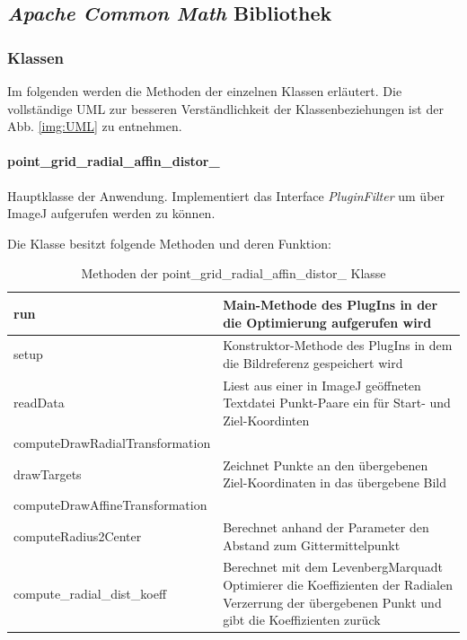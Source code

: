 \subsection{\textit{Apache Common Math} Bibliothek}

\subsubsection{Klassen}

Im folgenden werden die Methoden der einzelnen Klassen erläutert. Die vollständige UML zur besseren Verständlichkeit der Klassenbeziehungen ist der Abb. \ref{img:UML} zu entnehmen.

\paragraph{point\_grid\_radial\_affin\_distor\_}
Hauptklasse der Anwendung. Implementiert das Interface \emph{PluginFilter} um über ImageJ aufgerufen werden zu können.

Die Klasse besitzt folgende Methoden und deren Funktion:

\begin{table}[H]
\begin{tabular}{p{} | p{}} 
run & Main-Methode des PlugIns in der die Optimierung aufgerufen wird\\ \hline
setup & Konstruktor-Methode des PlugIns in dem die Bildreferenz gespeichert wird\\ \hline
readData & Liest aus einer in ImageJ geöffneten Textdatei Punkt-Paare ein für Start- und Ziel-Koordinten\\
computeDrawRadialTransformation & \\ \hline
drawTargets & Zeichnet Punkte an den übergebenen Ziel-Koordinaten in das übergebene Bild\\ \hline
computeDrawAffineTransformation & \\ \hline
computeRadius2Center & Berechnet anhand der Parameter den Abstand zum Gittermittelpunkt\\ \hline
compute\_radial\_dist\_koeff & Berechnet mit dem LevenbergMarquadt Optimierer die Koeffizienten der Radialen Verzerrung der übergebenen Punkt und gibt die Koeffizienten zurück\\ 
\end{tabular}
\caption{Methoden der point\_grid\_radial\_affin\_distor\_ Klasse}
\end{table}
